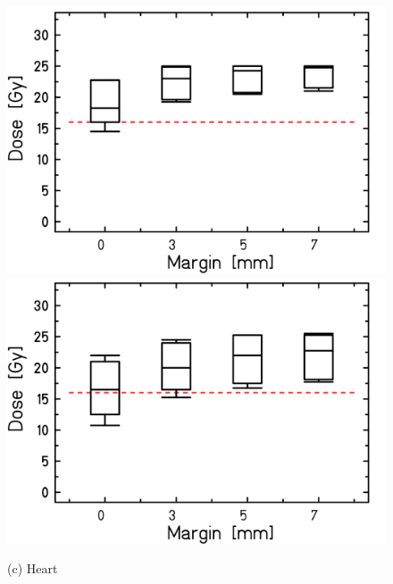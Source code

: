 \begin{figure}[H]
\begin{minipage}{0.31\textwidth}
  \includegraphics[width=\textwidth]{./teile/results_human/Whisker_HEARTwoOverlap_IMPT_woOverlap.png}
\end{minipage}
\hfill
\begin{minipage}{0.31\textwidth}
  \includegraphics[width=\textwidth]{./teile/results_human/Whisker_HEARTwoOverlap_IMPT_woOverlap_otherParameters.png}
\end{minipage}
\hfill
\vspace*{0.1cm}
\begin{minipage}{\textwidth}
 \hspace*{7.5cm} (c) Heart \\
\end{minipage}
\hfill
\begin{minipage}{0.31\textwidth}

\end{minipage}
\end{figure}
